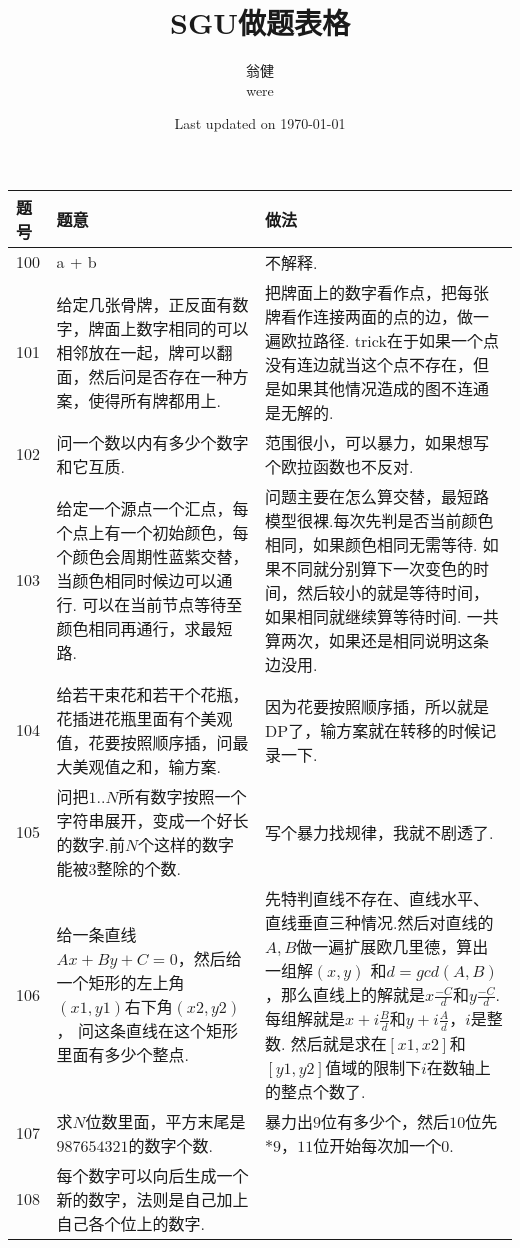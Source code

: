 \documentclass{article}
\begin{document}
		\title{SGU做题表格}
		\author{翁健\\were}
		\date{Last updated on \today}
		\maketitle
		\begin{longtable}{|p{1cm}|p{5cm}|p{5cm}|}
			\hline
			题号 & 题意 & 做法 \\
			\hline
			100 &
			a + b &
			不解释.\\
			\hline
			101 &
			给定几张骨牌，正反面有数字，牌面上数字相同的可以相邻放在一起，牌可以翻面，然后问是否存在一种方案，使得所有牌都用上. &
			把牌面上的数字看作点，把每张牌看作连接两面的点的边，做一遍欧拉路径.
			trick在于如果一个点没有连边就当这个点不存在，但是如果其他情况造成的图不连通是无解的.\\
			\hline
			102 &
			问一个数以内有多少个数字和它互质. &
			范围很小，可以暴力，如果想写个欧拉函数也不反对.\\
			\hline
			103 &
			给定一个源点一个汇点，每个点上有一个初始颜色，每个颜色会周期性蓝紫交替，当颜色相同时候边可以通行.
			可以在当前节点等待至颜色相同再通行，求最短路.&
			问题主要在怎么算交替，最短路模型很裸.每次先判是否当前颜色相同，如果颜色相同无需等待.
			如果不同就分别算下一次变色的时间，然后较小的就是等待时间，如果相同就继续算等待时间.
			一共算两次，如果还是相同说明这条边没用.\\
			\hline
			104 &
			给若干束花和若干个花瓶，花插进花瓶里面有个美观值，花要按照顺序插，问最大美观值之和，输方案. &
			因为花要按照顺序插，所以就是DP了，输方案就在转移的时候记录一下.\\
			\hline
			105 &
			问把$1..N$所有数字按照一个字符串展开，变成一个好长的数字.前$N$个这样的数字能被$3$整除的个数. &
			写个暴力找规律，我就不剧透了.\\
			\hline
			106 &
			给一条直线$Ax + By + C = 0$，然后给一个矩形的左上角$(x1,y1)$右下角$(x2,y2)$，
			问这条直线在这个矩形里面有多少个整点. &
			先特判直线不存在、直线水平、直线垂直三种情况.然后对直线的$A,B$做一遍扩展欧几里德，算出一组解$(x,y)$
			和$d=gcd(A,B)$，那么直线上的解就是$x\frac{-C}{d}$和$y\frac{-C}{d}$.
			每组解就是$x+i\frac{B}{d}$和$y+i\frac{A}{d}$，$i$是整数.
			然后就是求在$[x1,x2]$和$[y1,y2]$值域的限制下$i$在数轴上的整点个数了.\\
			\hline
			107 &
			求$N$位数里面，平方末尾是$987654321$的数字个数. &
			暴力出$9$位有多少个，然后$10$位先$*9$，$11$位开始每次加一个$0$.\\
			\hline
			108 &
			每个数字可以向后生成一个新的数字，法则是自己加上自己各个位上的数字.

\end{longtable}
\end{document}
